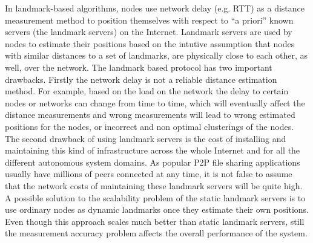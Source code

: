 In landmark-based algorithms, nodes use network delay (e.g. RTT) as a
distance measurement method to position themselves with respect to ``a priori''
known servers (the landmark servers) on the Internet. Landmark servers are used
by nodes to estimate their positions based on the intutive assumption that nodes
with similar distances to a set of landmarks, are physically close to each
other, as well, over the network. The landmark based protocol has two important
drawbacks. Firstly the network delay is not a reliable distance estimation
method. For example, based on the load on the network the delay to certain nodes
or networks can change from time to time, which will eventually affect the
distance measurements and wrong measurements will lead to wrong estimated
positions for the nodes, or incorrect and non optimal clusterings of the nodes.
The second drawback of using landmark servers is the cost of installing and
maintaining this kind of infrastructure across the whole Internet and for all
the different autonomous system domains. As popular P2P file sharing
applications usually have millions of peers connected at any time, it is not
false to assume that the network costs of maintaining these landmark servers
will be quite high. A possible solution to the scalability problem of the static
landmark servers is to use ordinary nodes as dynamic landmarks once they
estimate their own positions. Even though this approach scales much better than
static landmark servers, still the measurement accuracy problem affects the
overall performance of the system.